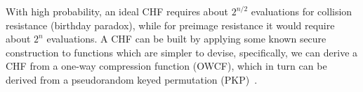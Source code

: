 \noindent With high probability, an ideal CHF requires about \(2^{n/2}\) evaluations
for collision resistance (birthday paradox), while for preimage resistance it would require about 
\(2^n\) evaluations.
A CHF can be built by applying some known secure construction to functions which are
simpler to devise, specifically, we can derive a CHF from a one-way compression function (OWCF), 
which in turn can be derived from a pseudorandom keyed permutation (PKP)~\cite{MenezesOV2001}.
\begin{comment}	
\begin{definition}[Pseudorandom keyed permutation]
	Given \(l, n \in \mathbb{N}\), an \emph{\(l/n\)(-bit) pseudo-random keyed permutation (PKP)} is
	any bijective function:
	\[F\colon {\left\{0, 1\right\}}^l \times {\left\{0, 1\right\}}^n \mapsto {\left\{0, 1\right\}}^l\]
	which is hard to distinguish from an uniform random distribution.
\end{definition}

\noindent PKPs are often built by iterating a keyed permutation \(F\) for some number \(r\) of
rounds, since \(F\) by itself might be relatively easy to invert.
A \emph{block cipher} is a pseudo-random keyed permutation which is easy to invert if we know
the key (\emph{trapdoor function}), and which is iterated for a certain number of rounds using
a different key every time, which is provided by a key-scheduling function.
\begin{theorem}[Feistel-Luby-Rackoff construction]
	Given a \(l/n\) pseudo-random keyed permutation \(P\), some
	\(m = \left(m_1, m_2\right) \mid m_1, m_2 \in {\left\{0, 1\right\}}^l\), some \(n > 3\), and some
	\(k = \left(k_1, \dots, k_n\right) \mid \forall i\colon k_i \in {\left\{0, 1\right\}}^n\), then
	the function \(E_P\) such that:
	\begin{align*}
		 & E_{P, i}\left(m, k\right) =
		\begin{cases}
			\left(m_1, m_2\right)                                                        & i = 0
			\\
			\left({E_{P, i-1}\left(m\right)}_2, m_1 \oplus P\left(m_2, k_i\right)\right) & 1 \le
			i \le n
		\end{cases} \\
		 & E_P	= E_{P,n}
	\end{align*}
	is a \(2l/k\) block cipher.
	Here, \(\oplus \) denotes addition after reinterpreting the arguments as elements of some
	field \(\mathbb{F}\) (typically \(\mathbb{F}_{2^n}\)).

\end{theorem}

\noindent Unkeyed permutations can be derived from keyed ones simply by fixing the key to some
arbitrary value.
\begin{definition}[One-way compression function]
	Given \(l_1, l_2, n \in \mathbb{N}\), an \emph{\(l_1/n/l_2\)(-bit) one-way compression function
		(OWCF)}
	is any function:
	\[
		F\colon {\left\{0, 1\right\}}^{l_1} \times {\left\{0, 1\right\}}^n \mapsto
		{\left\{0, 1\right\}}^{l_2}
	\]
\end{definition}
\end{comment}
